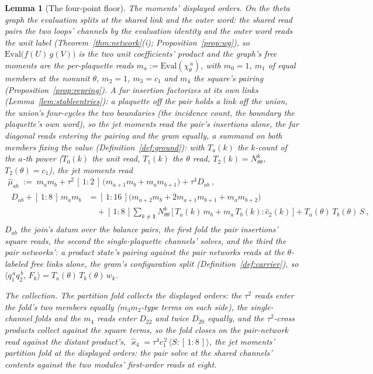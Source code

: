 \documentclass[11pt]{article}
\newtheorem{lemma}{Lemma}
\theoremstyle{definition}
\begin{document}
\begin{lemma}[The four-point floor]
\emph{The moments' displayed orders.} On the theta graph the
evaluation splits at the shared link and the outer word: the
shared read pairs the two loops' channels by the evaluation
identity and the outer word reads the unit label
(Theorem~\ref{thm:network}(i); Proposition~\ref{prop:wg}), so
$\mathrm{Eval}\big(f(U)\,g(V)\big)$ is the two unit coefficients'
product and the graph's free moments are the per-plaquette reads
$m_a:=\mathrm{Eval}(\chi_\theta^{\,a})$, with $m_0=1$, $m_1$ of
equal members at the nonunit $\theta$, $m_2=1$, $m_3=c_1$ and
$m_4$ the square's pairing (Proposition~\ref{prop:repring}). A far
insertion factorizes at its own links
(Lemma~\ref{lem:stableentries}): a plaquette off the pair holds a
link off the union, the union's four-cycles the two boundaries (the
incidence count, the boundary the plaquette's own word), so the jet
moments read the pair's insertions alone,
the far diagonal reads entering the pairing and the gram equally,
a summand on both members fixing the value
(Definition~\ref{def:ground}): with $T_a(k)$ the $k$-count of the
$a$-th power ($T_0(k)$ the unit read, $T_1(k)$ the $\theta$ read,
$T_2(k)=N^k_{\theta\theta}$, $T_2(\theta)=c_1$),
the \emph{jet moments} read
\begin{gather*}
\hat\mu_{ab}\;:=\;m_am_b
+\tau^2\,[\,1:2\,]\,\big(m_{a+1}m_b+m_am_{b+1}\big)
+\tau^4D_{ab}\ ,\\
\begin{aligned}
D_{ab}+[\,1:8\,]\,m_am_b
&=[\,1:16\,]\big(m_{a+2}m_b+2m_{a+1}m_{b+1}+m_am_{b+2}\big)\\
&\quad+[\,1:8\,]\sum_{k\ne\mathbf1}N^k_{\theta\theta}\,
\big[\,T_a(k)\,m_b+m_a\,T_b(k):\hat c_2(k)\,\big]
+T_a(\theta)\,T_b(\theta)\,S\ ,
\end{aligned}
\end{gather*}
$D_{ab}$ the join's datum over the balance pairs,
the first fold the pair insertions' square reads, the second the
single-plaquette channels' solves, and the third the pair
networks': a product state's pairing against the pair networks
reads at the $\theta$-labeled free links alone, the gram's
configuration split (Definition~\ref{def:carrier}), so
$\langle q_1^{\,a}q_2^{\,b},\,F_k\rangle
=T_a(\theta)\,T_b(\theta)\,w_k$.

\emph{The collection.} The partition fold collects the displayed
orders: the $\tau^2$ reads enter the fold's two members equally
($m_3m_2$-type terms on each side), the single-channel folds and
the $m_4$ reads enter $D_{22}$ and twice $D_{20}$ equally, and the
$\tau^2$-cross products collect against the square terms, so the
fold closes on the pair-network read against the distant
product's,
$\hat\varkappa_4=\tau^4c_1^{\,2}\,\langle S:[\,1:8\,]\rangle$,
the jet moments' partition fold at the displayed orders: the pair
solve at the shared channels' contents
against the two modules' first-order reads at eight.


\end{lemma}
\end{document}
